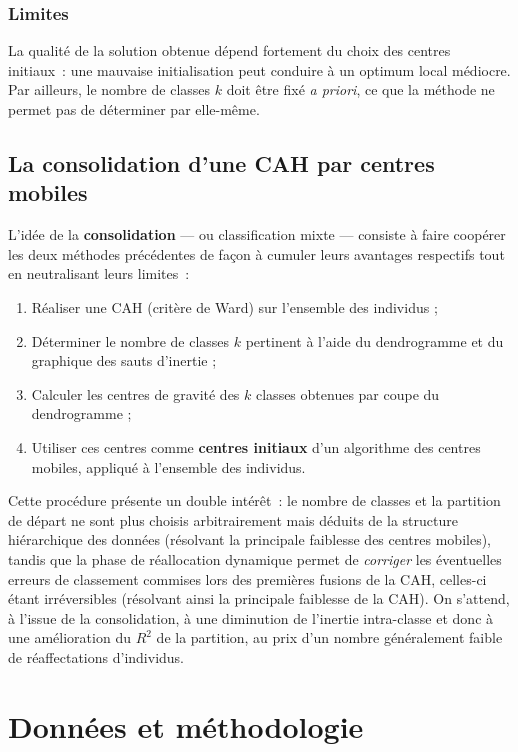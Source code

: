 \documentclass[11pt,a4paper,oneside]{book}
\begin{document}
\subsection{Limites}
La qualité de la solution obtenue dépend fortement du choix des centres initiaux~: une mauvaise initialisation peut conduire à un optimum local médiocre. Par ailleurs, le nombre de classes $k$ doit être fixé \emph{a priori}, ce que la méthode ne permet pas de déterminer par elle-même.

\section{La consolidation d'une CAH par centres mobiles}

L'idée de la \textbf{consolidation} --- ou classification mixte --- consiste à faire coopérer les deux méthodes précédentes de façon à cumuler leurs avantages respectifs tout en neutralisant leurs limites~:

\begin{enumerate}
  \item Réaliser une CAH (critère de Ward) sur l'ensemble des individus ;
  \item Déterminer le nombre de classes $k$ pertinent à l'aide du dendrogramme et du graphique des sauts d'inertie ;
  \item Calculer les centres de gravité des $k$ classes obtenues par coupe du dendrogramme ;
  \item Utiliser ces centres comme \textbf{centres initiaux} d'un algorithme des centres mobiles, appliqué à l'ensemble des individus.
\end{enumerate}

Cette procédure présente un double intérêt~: le nombre de classes et la partition de départ ne sont plus choisis arbitrairement mais déduits de la structure hiérarchique des données (résolvant la principale faiblesse des centres mobiles), tandis que la phase de réallocation dynamique permet de \emph{corriger} les éventuelles erreurs de classement commises lors des premières fusions de la CAH, celles-ci étant irréversibles (résolvant ainsi la principale faiblesse de la CAH). On s'attend, à l'issue de la consolidation, à une diminution de l'inertie intra-classe et donc à une amélioration du $R^2$ de la partition, au prix d'un nombre généralement faible de réaffectations d'individus.

\chapter{Données et méthodologie}
\end{document}
